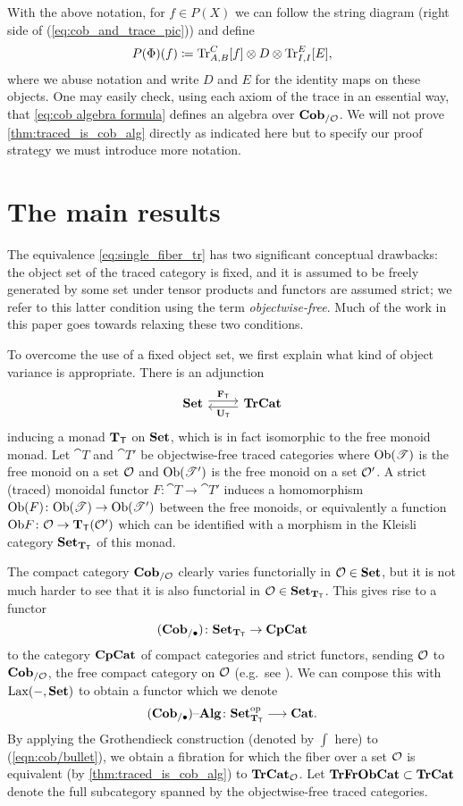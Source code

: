 \documentclass[11pt,oneside,article]{memoir}
\begin{document}
With the above notation, for $f\in P(X)$ we can follow the string diagram (right side of
(\ref{eq:cob_and_trace_pic})) and define
\begin{equation}
      \label{eq:cob algebra formula}
   P(\Phi)(f)\coloneqq\operatorname{Tr}_{A,B}^C[f]\otimes D\otimes\operatorname{Tr}^E_{I,I}[E],
\end{equation}
where we abuse notation and write $D$ and $E$ for the identity maps on these objects. One may easily
check, using each axiom of the trace \cite{JoyalStreetVerity} in an essential way, that
\eqref{eq:cob algebra formula} defines an algebra over $\mathbf{Cob}_{/\mathcal{O}}$. We will not prove
\ref{thm:traced_is_cob_alg} directly as indicated here but to specify our proof strategy we must
introduce more notation.

\section{The main results}
    \label{sec:main_results}

The equivalence \eqref{eq:single_fiber_tr} has two significant conceptual drawbacks: the object set
of the traced category is fixed, and it is assumed to be freely generated by some set under tensor
products and functors are assumed strict; we refer to this latter condition using the term \emph{objectwise-free}. Much of the work
in this paper goes towards relaxing these two conditions.

To overcome the use of a fixed object set, we first explain what kind of object variance is
appropriate. There is an adjunction
\[
  \Adjoint{\Set}{\TrCat}{\FT}{\UT}
\]
inducing a monad $\mathbf{T}_{\mathsf{T}}$ on $\mathbf{Set}$, which is in fact isomorphic to the free monoid monad. Let
$\cat{T}$ and $\cat{T}'$ be objectwise-free traced categories where $\mathrm{Ob}(\mathscr{T})$ is the free
monoid on a set $\mathcal{O}$ and $\mathrm{Ob}(\mathscr{T}')$ is the free monoid on a set $\mathcal{O}'$. A strict
(traced) monoidal functor $F\colon \cat{T}\to \cat{T}'$ induces a homomorphism
$\mathrm{Ob}(F)\colon\mathrm{Ob}(\mathscr{T})\to\mathrm{Ob}(\mathscr{T}')$ between the free monoids, or equivalently a function $\mathrm{Ob}
F\colon\mathcal{O}\to\mathbf{T}_{\mathsf{T}}(\mathcal{O}')$ which can be identified with a morphism in the Kleisli category
$\mathbf{Set}_{\mathbf{T}_{\mathsf{T}}}$ of this monad.

The compact category $\mathbf{Cob}_{/\mathcal{O}}$ clearly varies functorially in $\mathcal{O}\in\mathbf{Set}$, but it is not
much harder to see that it is also functorial in $\mathcal{O}\in\mathbf{Set}_{\mathbf{T}_{\mathsf{T}}}$.  This gives rise to a functor
\[
  (\mathbf{Cob}_{/\bullet})\colon\mathbf{Set}_{\mathbf{T}_{\mathsf{T}}}\to\mathbf{CpCat}
\]
to the category $\mathbf{CpCat}$ of compact categories and strict functors, sending $\mathcal{O}$ to
$\mathbf{Cob}_{/\mathcal{O}}$, the free compact category on $\mathcal{O}$ (e.g.\ see \cite{KellyLaplaza,Abramsky2}).
We can compose this with $\operatorname{Lax}(-,\mathbf{Set})$ to obtain a functor which we denote
\begin{equation}
      \label{eqn:cob/bullet}
   (\mathbf{Cob}_{/\bullet}){\text \textendash}\mathbf{Alg}\colon\mathbf{Set}_{\mathbf{T}_{\mathsf{T}}}^{\mathrm{op}}\longrightarrow\mathbf{Cat}.
\end{equation}
By applying the Grothendieck construction (denoted by $\int$ here) to (\ref{eqn:cob/bullet}), we
obtain a fibration for which the fiber over a set $\mathcal{O}$ is equivalent (by
\ref{thm:traced_is_cob_alg}) to $\mathbf{TrCat}_{\mathcal{O}}$. Let $\mathbf{TrFrObCat}\subset\mathbf{TrCat}$ denote the
full subcategory spanned by the objectwise-free traced categories.
\end{document}
